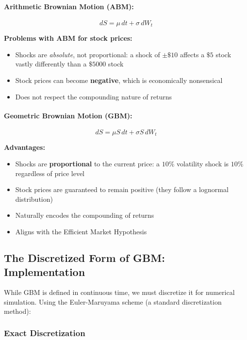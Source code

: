 \documentclass[12pt,a4paper]{article}
\begin{document}
\paragraph{Arithmetic Brownian Motion (ABM):}
\begin{equation}
dS = \mu \, dt + \sigma \, dW_t
\end{equation}

\textbf{Problems with ABM for stock prices:}
\begin{itemize}
    \item Shocks are \textit{absolute}, not proportional: a shock of $\pm\$10$ affects a $\$5$ stock vastly differently than a $\$5000$ stock
    \item Stock prices can become \textbf{negative}, which is economically nonsensical
    \item Does not respect the compounding nature of returns
\end{itemize}

\paragraph{Geometric Brownian Motion (GBM):}
\begin{equation}
dS = \mu S \, dt + \sigma S \, dW_t
\end{equation}

\textbf{Advantages:}
\begin{itemize}
    \item Shocks are \textbf{proportional} to the current price: a $10\%$ volatility shock is $10\%$ regardless of price level
    \item Stock prices are guaranteed to remain positive (they follow a lognormal distribution)
    \item Naturally encodes the compounding of returns
    \item Aligns with the Efficient Market Hypothesis
\end{itemize}

\subsection{The Discretized Form of GBM: Implementation}

While GBM is defined in continuous time, we must discretize it for numerical simulation. Using the Euler-Maruyama scheme (a standard discretization method):

\subsubsection{Exact Discretization}
\end{document}
